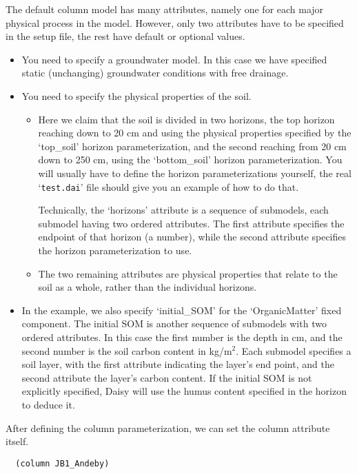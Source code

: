 The default column model has many attributes, namely one for each
major physical process in the model.  However, only two attributes
have to be specified in the setup file, the rest have default or
optional values.
\begin{itemize}
\item You need to specify a groundwater model.  In this case we have
  specified static (unchanging) groundwater conditions with free
  drainage.
\item You need to specify the physical properties of the
  soil.  
  \begin{itemize}
  \item Here we claim that the soil is divided in two horizons, the
    top horizon reaching down to 20 cm and using the physical
    properties specified by the `top\_soil' horizon parameterization,
    and the second reaching from 20 cm down to 250 cm, using the
    `bottom\_soil' horizon parameterization.  You will usually have to
    define the horizon parameterizations yourself, the real
    `\texttt{test.dai}' file should give you an example of how to do
    that.
    
    Technically, the `horizons' attribute is a sequence of submodels,
    each submodel having two ordered attributes.  The first attribute
    specifies the endpoint of that horizon (a number), while the second
    attribute specifies the horizon parameterization to use.
  \item The two remaining attributes are physical properties that
    relate to the soil as a whole, rather than the individual
    horizons.
  \end{itemize}  
\item In the example, we also specify `initial\_SOM' for the
  `OrganicMatter' fixed component.  The initial SOM is another
  sequence of submodels with two ordered attributes.  In this case the
  first number is the depth in cm, and the second number is the soil
  carbon content in kg/$\mbox{m}^2$.  Each submodel specifies a soil
  layer, with the first attribute indicating the layer's end point, and
  the second attribute the layer's carbon content.  If the initial SOM
  is not explicitly specified, Daisy will use the humus content
  specified in the horizon to deduce it.
\end{itemize}

After defining the column parameterization, we can set the column
attribute itself.

\begin{verbatim}
  (column JB1_Andeby)
\end{verbatim}

